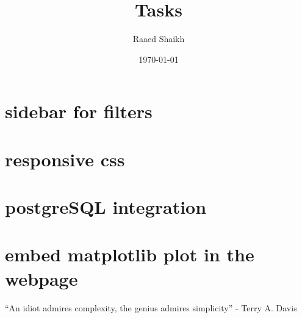 \documentclass[11pt]{article}
\author{Raaed Shaikh}
\date{\today}
\title{Tasks}
\begin{document}
\maketitle
\tableofcontents


\section{sidebar for filters}
\label{sec:org2b2f515}
\section{responsive css}
\label{sec:org8f616b5}
\section{postgreSQL integration}
\label{sec:org4ce1994}
\section{embed matplotlib plot in the webpage}
\label{sec:org2203b9b}

``An idiot admires complexity, the genius admires simplicity'' - Terry A. Davis
\end{document}
